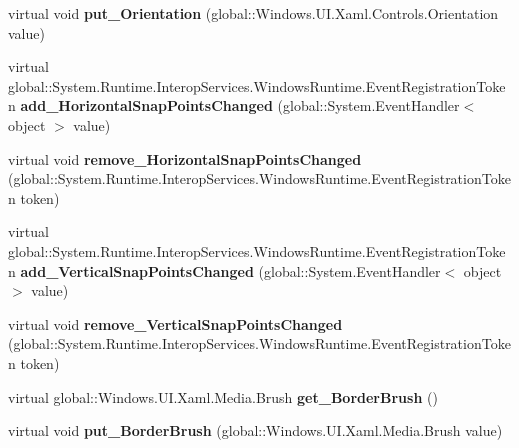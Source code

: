 \begin{DoxyCompactItemize}
virtual void {\bfseries put\+\_\+\+Orientation} (global\+::\+Windows.\+U\+I.\+Xaml.\+Controls.\+Orientation value)
\item 
\mbox{\label{class_windows_1_1_u_i_1_1_xaml_1_1_controls_1_1_stack_panel_a86815ce8db81cb7b06e7beebaa97e788}} 
virtual global\+::\+System.\+Runtime.\+Interop\+Services.\+Windows\+Runtime.\+Event\+Registration\+Token {\bfseries add\+\_\+\+Horizontal\+Snap\+Points\+Changed} (global\+::\+System.\+Event\+Handler$<$ object $>$ value)
\item 
\mbox{\label{class_windows_1_1_u_i_1_1_xaml_1_1_controls_1_1_stack_panel_aabdd867d8e829595aa1cd0066bb43b7c}} 
virtual void {\bfseries remove\+\_\+\+Horizontal\+Snap\+Points\+Changed} (global\+::\+System.\+Runtime.\+Interop\+Services.\+Windows\+Runtime.\+Event\+Registration\+Token token)
\item 
\mbox{\label{class_windows_1_1_u_i_1_1_xaml_1_1_controls_1_1_stack_panel_ad8defe3d3a6f357c9736a835aaf0d633}} 
virtual global\+::\+System.\+Runtime.\+Interop\+Services.\+Windows\+Runtime.\+Event\+Registration\+Token {\bfseries add\+\_\+\+Vertical\+Snap\+Points\+Changed} (global\+::\+System.\+Event\+Handler$<$ object $>$ value)
\item 
\mbox{\label{class_windows_1_1_u_i_1_1_xaml_1_1_controls_1_1_stack_panel_ad941c568cedfbb247496984f450b1857}} 
virtual void {\bfseries remove\+\_\+\+Vertical\+Snap\+Points\+Changed} (global\+::\+System.\+Runtime.\+Interop\+Services.\+Windows\+Runtime.\+Event\+Registration\+Token token)
\item 
\mbox{\label{class_windows_1_1_u_i_1_1_xaml_1_1_controls_1_1_stack_panel_ade57d63ba167e564115c51076407b86d}} 
virtual global\+::\+Windows.\+U\+I.\+Xaml.\+Media.\+Brush {\bfseries get\+\_\+\+Border\+Brush} ()
\item 
\mbox{\label{class_windows_1_1_u_i_1_1_xaml_1_1_controls_1_1_stack_panel_a9465b7d293751e261c9deb8f5bbc74f1}} 
virtual void {\bfseries put\+\_\+\+Border\+Brush} (global\+::\+Windows.\+U\+I.\+Xaml.\+Media.\+Brush value)

\end{DoxyCompactItemize}
